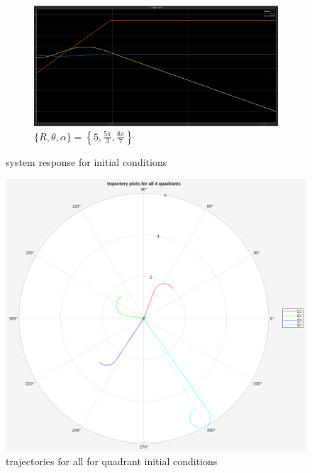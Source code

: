 \documentclass[12pt]{article}
\begin{document}
\begin{figure}[h]
\begin{subfigure}{.48\textwidth}
    \end{subfigure}
    \begin{subfigure}{.48\textwidth}
        \centering
        \includegraphics[width=0.9\linewidth]{images/Q4.png}
		\caption{\(\{R, \theta, \alpha\} = \left\{5, \frac{5\pi}{3}, \frac{8\pi}{7}\right\}\)}
    \end{subfigure}
    \caption{system response for initial conditions}
\end{figure}

\begin{figure}[ht!]
	\centering
	\includegraphics[width=0.75\linewidth]{images/quadrants.png}
	\caption{trajectories for all for quadrant initial conditions}
\end{figure}
\end{document}
